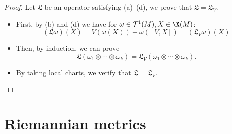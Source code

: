 \begin{proof}
Let $\mathfrak{L}$ be an operator satisfying (a)--(d), we prove that $\mathfrak{L}=\mathfrak{L}_V$.
\begin{itemize}
\item First, by (b) and (d) we have for $\omega\in\mathcal{T}^1(M),X\in\X(M)$:
\[(\mathfrak{L}\omega)(X)=V(\omega(X))-\omega([V,X])=(\mathfrak{L}_V\omega)(X)\]
\item Then, by induction, we can prove
\[\mathfrak{L}(\omega_1\otimes\cdots\otimes \omega_k)=\mathfrak{L}_V(\omega_1\otimes\cdots\otimes\omega_k).\]
\item By taking local charts, we verify that $\mathfrak{L}=\mathfrak{L}_V$.
\end{itemize}
\end{proof}
\section{Riemannian metrics}
